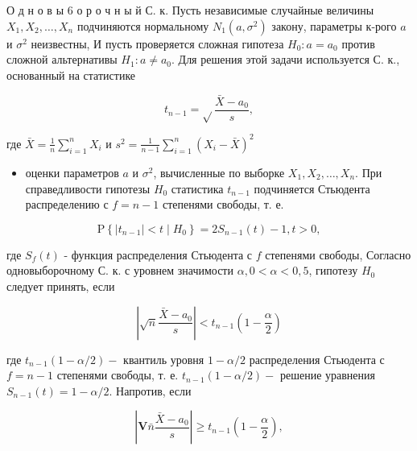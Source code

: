 \documentclass[10pt]{article}
\begin{document}
О д н о в ы 6 о р о ч н ы й С. к. Пусть независимые случайные величины $X_{1}, X_{2}, \ldots, X_{n}$ подчиняются нормальному $N_{1}\left(a, \sigma^{2}\right)$ закону, параметры к-рого $a$ и $\sigma^{2}$ неизвестны, И пусть проверяется сложная гипотеза $H_{0}: a=a_{0}$ против сложной альтернативы $H_{1}: a \neq a_{0}$. Для решения этой задачи используется С. к., основанный на статистике



\[

t_{n-1}=\sqrt{ } \frac{\bar{X}-a_{0}}{s},

\]



где $\bar{X}=\frac{1}{n} \sum_{i=1}^{n} X_{i}$ и $s^{2}=\frac{1}{n-1} \sum_{i=1}^{n}\left(X_{i}-\bar{X}\right)^{2}$



\begin{itemize}

  \item оценки параметров $a$ и $\sigma^{2}$, вычисленные по выборке $X_{1}, X_{2}, \ldots, X_{n}$. При справедливости гипотезы $H_{0}$ статистика $t_{n-1}$ подчиняется Стьюдента распределению с $f=n-1$ степенями свободы, т. е.

\end{itemize}



\[

\mathrm{P}\left\{\left|t_{n-1}\right|<t \mid H_{0}\right\}=2 S_{n-1}(t)-1, t>0,

\]



где $S_{f}(t)$ - функция распределения Стьюдента с $f$ степенями свободы, Согласно одновыборочному С. к. с уровнем значимости $\alpha, 0<\alpha<0,5$, гипотезу $H_{0}$ следует принять, если



\[

\left|\sqrt{n} \frac{\bar{X}-a_{0}}{s}\right|<t_{n-1}\left(1-\frac{\alpha}{2}\right)

\]



где $t_{n-1}(1-\alpha / 2)-$ квантиль уровня $1-\alpha / 2$ распределения Стьюдента с $f=n-1$ степенями свободы, т. е. $t_{n-1}(1-\alpha / 2)-$ решение уравнения $S_{n-1}(t)=1-\alpha / 2$. Напротив, если



\[

\left|\boldsymbol{V} \bar{n} \frac{\bar{X}-a_{0}}{s}\right| \geqslant t_{n-1}\left(1-\frac{\alpha}{2}\right),

\]
\end{document}
